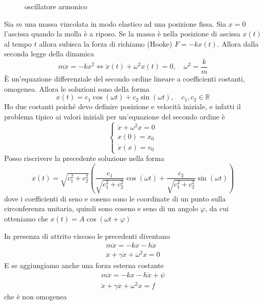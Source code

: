 \begin{example}
\begin{figure}[ht]
    \centering
    \caption{oscillatore armonico}
    \label{fig:oscillatore_armonico}
\end{figure}
    Sia \(m\) una massa vincolata in modo elastico ad una posizione fissa. Sia
    \(x=0\) l'ascissa quando la molla è a riposo. Se la massa è nella posizione
    di ascissa \(x(t)\) al tempo \(t\) allora subisca la forza di richiamo
    (Hooke) \(F = -kx(t)\). Allora dalla seconda legge della dinamica
    \[
        m \ddot{x} = -kx^2 \iff \ddot{x}(t) + \omega^2 x(t) = 0, \quad \omega^2
        = \frac{k}{m}
    \]
    È un'equazione differenziale del secondo ordine lineare a coefficienti
    costanti, omogenea. Allora le soluzioni sono della forma
    \[
        x(t) = c_{1}\cos(\omega t) + c_{2}\sin(\omega t), \quad c_{1}, c_{2} \in
        \mathbb{R}
    \]
    Ho due costanti poiché devo definire posizione e velocità iniziale, e
    infatti il problema tipico ai valori iniziali per un'equazione del secondo
    ordine è 
    \[
        \begin{cases}
            \ddot{x} + \omega^2x = 0 \\
            x(0) = x_{0} \\
            \dot{x}(x) = v_{0}
        \end{cases}
    \]
    Posso riscrivere la precedente soluzione nella forma 
    \[
        x(t) =
        \sqrt{c_{1}^2+c_{2}^2}(\frac{c_{1}}{\sqrt{c_{1}^2+c_{2}^2}}\cos(\omega
        t) + \frac{c_{2}}{\sqrt{c_{1}^2+c_{2}^2}}\sin(\omega t))
    \]
    dove i coefficienti di seno e coseno sono le coordinate di un punto sulla
    circonferenza unitaria, quindi sono coseno e seno di un angolo \(\varphi\),
    da cui otteniamo che \(x(t) = A\cos(\omega t + \varphi)\) 
\end{example}
\begin{example}
    In presenza di attrito viscoso le precedenti diventano
    \begin{align*}
        m\ddot{x} = -kx - h\dot{x} \\
        \ddot{x} + \gamma \dot{x} + \omega^2x = 0
    \end{align*}
    E se aggiungiamo anche una forza esterna costante 
    \begin{align*}
        m\ddot{x} = -kx - h\dot{x} + \psi \\
        \ddot{x} + \gamma \dot{x} + \omega^2x = f
    \end{align*}
    che è non omogenea
\end{example}
